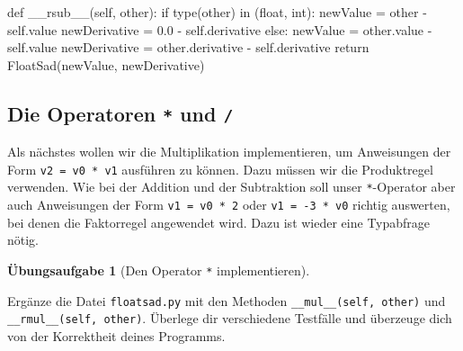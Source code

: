 \documentclass[
  letterpaper,
  DIV=11,
  oneside]{scrreprt}
\newenvironment{Shaded}{\begin{snugshade}}{\end{snugshade}}
\newcommand{\BuiltInTok}[1]{\textcolor[rgb]{0.00,0.23,0.31}{#1}}
\newcommand{\ControlFlowTok}[1]{\textcolor[rgb]{0.00,0.23,0.31}{#1}}
\newcommand{\FloatTok}[1]{\textcolor[rgb]{0.68,0.00,0.00}{#1}}
\newcommand{\FunctionTok}[1]{\textcolor[rgb]{0.28,0.35,0.67}{#1}}
\newcommand{\KeywordTok}[1]{\textcolor[rgb]{0.00,0.23,0.31}{#1}}
\newcommand{\NormalTok}[1]{\textcolor[rgb]{0.00,0.23,0.31}{#1}}
\newcommand{\OperatorTok}[1]{\textcolor[rgb]{0.37,0.37,0.37}{#1}}
\newcommand{\VariableTok}[1]{\textcolor[rgb]{0.07,0.07,0.07}{#1}}
\theoremstyle{definition}
\newtheorem{exercise}{Übungsaufgabe}[chapter]
\theoremstyle{definition}
\theoremstyle{remark}
\begin{document}
\begin{tcolorbox}
\begin{Shaded}
\begin{Highlighting}[]
\KeywordTok{def} \FunctionTok{\_\_rsub\_\_}\NormalTok{(}\VariableTok{self}\NormalTok{, other):}
    \ControlFlowTok{if} \BuiltInTok{type}\NormalTok{(other) }\KeywordTok{in}\NormalTok{ (}\BuiltInTok{float}\NormalTok{, }\BuiltInTok{int}\NormalTok{):}
\NormalTok{        newValue }\OperatorTok{=}\NormalTok{ other }\OperatorTok{{-}} \VariableTok{self}\NormalTok{.value}
\NormalTok{        newDerivative }\OperatorTok{=} \FloatTok{0.0} \OperatorTok{{-}} \VariableTok{self}\NormalTok{.derivative}
    \ControlFlowTok{else}\NormalTok{:}
\NormalTok{        newValue }\OperatorTok{=}\NormalTok{ other.value }\OperatorTok{{-}} \VariableTok{self}\NormalTok{.value}
\NormalTok{        newDerivative }\OperatorTok{=}\NormalTok{ other.derivative }\OperatorTok{{-}} \VariableTok{self}\NormalTok{.derivative}
    \ControlFlowTok{return}\NormalTok{ FloatSad(newValue, newDerivative)}
\end{Highlighting}
\end{Shaded}

\end{tcolorbox}

\hypertarget{die-operatoren-und}{%
\subsection{\texorpdfstring{Die Operatoren \texttt{*} und
\texttt{/}}{Die Operatoren * und /}}\label{die-operatoren-und}}

Als nächstes wollen wir die Multiplikation implementieren, um
Anweisungen der Form \texttt{v2\ =\ v0\ *\ v1} ausführen zu können. Dazu
müssen wir die Produktregel verwenden. Wie bei der Addition und der
Subtraktion soll unser \texttt{*}-Operator aber auch Anweisungen der
Form \texttt{v1\ =\ v0\ *\ 2} oder \texttt{v1\ =\ -3\ *\ v0} richtig
auswerten, bei denen die Faktorregel angewendet wird. Dazu ist wieder
eine Typabfrage nötig.

\leavevmode{}%
\begin{exercise}[Den Operator \texttt{*}
implementieren]\label{exr-ImplementMul}

Ergänze die Datei \texttt{floatsad.py} mit den Methoden
\texttt{\_\_mul\_\_(self,\ other)} und
\texttt{\_\_rmul\_\_(self,\ other)}. Überlege dir verschiedene Testfälle
und überzeuge dich von der Korrektheit deines Programms.

\end{exercise}
\end{document}
